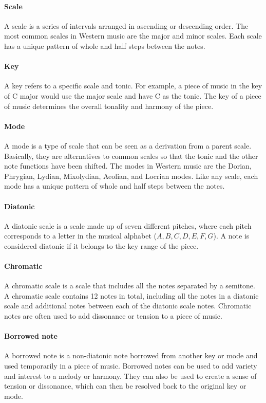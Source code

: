 \paragraph{Scale}
A scale is a series of intervals arranged in ascending or descending order. The most common scales in Western music are the major and minor scales. Each scale has a unique pattern of whole and half steps between the notes.

\paragraph{Key}
A key refers to a specific scale and tonic. For example, a piece of music in the key of C major would use the major scale and have C as the tonic. The key of a piece of music determines the overall tonality and harmony of the piece.

\paragraph{Mode}
A mode is a type of scale that can be seen as a derivation from a parent scale. Basically, they are alternatives to common scales so that the tonic and the other note functions have been shifted. The modes in Western music are the Dorian, Phrygian, Lydian, Mixolydian, Aeolian, and Locrian modes. Like any scale, each mode has a unique pattern of whole and half steps between the notes.

\paragraph{Diatonic}
A diatonic scale is a scale made up of seven different pitches, where each pitch corresponds to a letter in the musical alphabet ($A, B, C, D, E, F, G$). A note is considered diatonic if it belongs to the key range of the piece.

\paragraph{Chromatic}
A chromatic scale is a scale that includes all the notes separated by a semitone. A chromatic scale contains 12 notes in total, including all the notes in a diatonic scale and additional notes between each of the diatonic scale notes. Chromatic notes are often used to add dissonance or tension to a piece of music.

\paragraph{Borrowed note}
A borrowed note is a non-diatonic note borrowed from another key or mode and used temporarily in a piece of music. Borrowed notes can be used to add variety and interest to a melody or harmony. They can also be used to create a sense of tension or dissonance, which can then be resolved back to the original key or mode.

